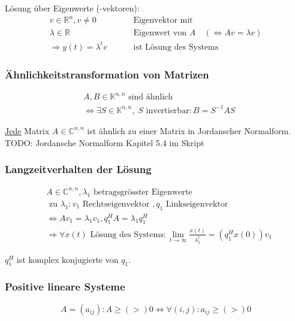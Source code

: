\documentclass[a4paper]{article}
\newcommand{\R}{\mathbb{R}}
\begin{document}
Lösung über Eigenwerte (-vektoren):
\begin{align*}
	v \in \R ^{n}, v \ne 0 \qquad
	& \text{ Eigenvektor mit } \\
	\lambda \in \R \qquad
	& \text{ Eigenwert von } A
	\quad ( \Leftrightarrow  Av = \lambda v ) \\
	\Rightarrow y(t) = \lambda ^{t} v \qquad
	& \text{ ist Lösung des Systems }
\end{align*}

\subsubsection{Ähnlichkeitstransformation von Matrizen}
\begin{align*}
	& A, B \in \mathbb{K} ^{n, n} \text{ sind ähnlich } \\
	& \Leftrightarrow \exists
		S \in \mathbb{K} ^{n,n},\; S \text{ invertierbar} :
		B = S ^{-1} A S
\end{align*}

\underline{Jede} Matrix $A \in \mathbb{C} ^{n,n}$ ist ähnlich
zu einer Matrix in Jordanscher Normalform.
\\

TODO: Jordansche Normalform Kapitel 5.4 im Skript

\subsubsection{Langzeitverhalten der Lösung}
\begin{align*}
	& A \in \mathbb{C} ^{n,n}, \lambda_1 \text{ betragsgrösster Eigenwerte } \\
	& \text{ zu } \lambda_1 : v_1 \text{ Rechtseigenvektor }, q_1
	\text{ Linkseigenvektor } \\
	& \Leftrightarrow A v_1 = \lambda_1 v_1, q_1 ^{H} A = \lambda_1 q_1 ^{H} \\
	&\Rightarrow \forall x(t) \text{ Lösung des Systems}:
	\lim_{t \to \infty} \frac{ x(t) }{ \lambda_1 ^{t} }
	= (q_1 ^{H} x(0)) v_1
\end{align*}

$q_1 ^{H}$ ist komplex konjugierte von $q_1$.

\subsubsection{Positive lineare Systeme}
\[
	A = (a_{ij}):
	A \geq (>) 0 \Leftrightarrow \forall (i, j): a_{ij} \geq (>) 0
\] 
\end{document}
